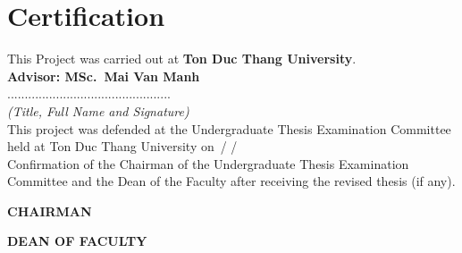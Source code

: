 \chapter*{Certification}


This Project was carried out at \textbf{Ton Duc Thang University}.\\[0.5em]
\textbf{Advisor: MSc.~Mai Van Manh}\\[2em]

...............................................\\
\textit{(Title, Full Name and Signature)}\\[3em]

This project was defended at the Undergraduate Thesis Examination Committee 
held at Ton Duc Thang University on \dotfill\,/\,\dotfill\,/\,\dotfill\\[3em]

Confirmation of the Chairman of the Undergraduate Thesis Examination Committee  
and the Dean of the Faculty after receiving the revised thesis (if any).\\[3em]

\noindent
\begin{minipage}[t]{0.48\textwidth}
  \centering
  \textbf{CHAIRMAN}\\[5em]
  \dotfill
\end{minipage}\hfill
\begin{minipage}[t]{0.48\textwidth}
  \centering
  \textbf{DEAN OF FACULTY}\\[5em]
  \dotfill
\end{minipage}